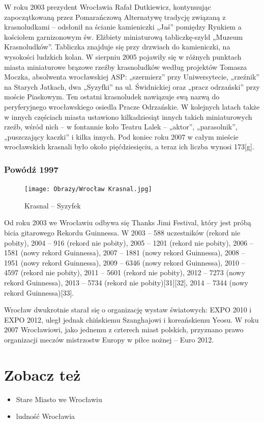 \documentclass{article}
\begin{document}
W roku 2003 prezydent Wrocławia Rafał Dutkiewicz, kontynuując zapoczątkowaną przez Pomarańczową Alternatywę tradycję związaną z krasnoludkami – odsłonił na ścianie kamieniczki „Jaś” pomiędzy Rynkiem a kościołem garnizonowym św. Elżbiety miniaturową tabliczkę-szyld „Muzeum Krasnoludków”. Tabliczka znajduje się przy drzwiach do kamieniczki, na wysokości ludzkich kolan. W sierpniu 2005 pojawiły się w różnych punktach miasta miniaturowe brązowe rzeźby krasnoludków według projektów Tomasza Moczka, absolwenta wrocławskiej ASP: „szermierz” przy Uniwersytecie, „rzeźnik” na Starych Jatkach, dwa „Syzyfki” na ul. Świdnickiej oraz „pracz odrzański” przy moście Piaskowym. Ten ostatni krasnoludek nawiązuje swą nazwą do peryferyjnego wrocławskiego osiedla Pracze Odrzańskie. W kolejnych latach także w innych częściach miasta ustawiono kilkadziesiąt innych takich miniaturowych rzeźb, wśród nich – w fontannie koło Teatru Lalek – „aktor”, „parasolnik”, „puszczający kaczki” i kilka innych. Pod koniec roku 2007 w całym mieście wrocławskich krasnali było około pięćdziesięciu, a teraz ich liczba wynosi 173[g].
\subsubsection{Powódź 1997}
\begin{figure}[h!]
\centering
\texttt{[image: Obrazy/Wrocław Krasnal.jpg]}
\caption{Krasnal – Syzyfek}
\label{fig:krasnal}
\end{figure}
Od roku 2003 we Wrocławiu odbywa się Thanks Jimi Festival, który jest próbą bicia gitarowego Rekordu Guinnessa. W 2003 – 588 uczestników (rekord nie pobity), 2004 – 916 (rekord nie pobity), 2005 – 1201 (rekord nie pobity), 2006 – 1581 (nowy rekord Guinnessa), 2007 – 1881 (nowy rekord Guinnessa), 2008 – 1951 (nowy rekord Guinnessa), 2009 – 6346 (nowy rekord Guinnessa), 2010 – 4597 (rekord nie pobity), 2011 – 5601 (rekord nie pobity), 2012 – 7273 (nowy rekord Guinnessa), 2013 – 5734 (rekord nie pobity)[31][32], 2014 – 7344 (nowy rekord Guinnessa)[33].

Wrocław dwukrotnie starał się o organizację wystaw światowych: EXPO 2010 i EXPO 2012, uległ jednak chińskiemu Szanghajowi i koreańskiemu Yeosu. W roku 2007 Wrocławiowi, jako jednemu z czterech miast polskich, przyznano prawo organizacji meczów mistrzostw Europy w piłce nożnej – Euro 2012.
\section{Zobacz też}
\begin{itemize}
\item Stare Miasto we Wrocławiu
\item ludność Wrocławia
\end{itemize}
\newpage
\end{document}
